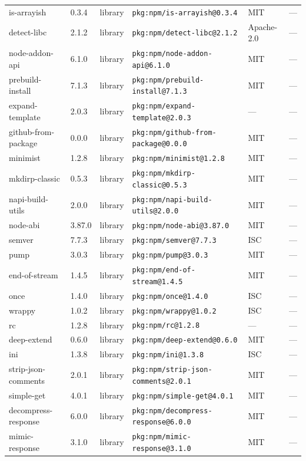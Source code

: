 \documentclass[11pt]{article}
\begin{document}
\begin{longtable}{|l|l|l|p{2.2cm}|l|p{4cm}|}
is-arrayish & 0.3.4 & library & \texttt{pkg:npm/is-arrayish@0.3.4} & MIT & — \\
detect-libc & 2.1.2 & library & \texttt{pkg:npm/detect-libc@2.1.2} & Apache-2.0 & — \\
node-addon-api & 6.1.0 & library & \texttt{pkg:npm/node-addon-api@6.1.0} & MIT & — \\
prebuild-install & 7.1.3 & library & \texttt{pkg:npm/prebuild-install@7.1.3} & MIT & — \\
expand-template & 2.0.3 & library & \texttt{pkg:npm/expand-template@2.0.3} & — & — \\
github-from-package & 0.0.0 & library & \texttt{pkg:npm/github-from-package@0.0.0} & MIT & — \\
minimist & 1.2.8 & library & \texttt{pkg:npm/minimist@1.2.8} & MIT & — \\
mkdirp-classic & 0.5.3 & library & \texttt{pkg:npm/mkdirp-classic@0.5.3} & MIT & — \\
napi-build-utils & 2.0.0 & library & \texttt{pkg:npm/napi-build-utils@2.0.0} & MIT & — \\
node-abi & 3.87.0 & library & \texttt{pkg:npm/node-abi@3.87.0} & MIT & — \\
semver & 7.7.3 & library & \texttt{pkg:npm/semver@7.7.3} & ISC & — \\
pump & 3.0.3 & library & \texttt{pkg:npm/pump@3.0.3} & MIT & — \\
end-of-stream & 1.4.5 & library & \texttt{pkg:npm/end-of-stream@1.4.5} & MIT & — \\
once & 1.4.0 & library & \texttt{pkg:npm/once@1.4.0} & ISC & — \\
wrappy & 1.0.2 & library & \texttt{pkg:npm/wrappy@1.0.2} & ISC & — \\
rc & 1.2.8 & library & \texttt{pkg:npm/rc@1.2.8} & — & — \\
deep-extend & 0.6.0 & library & \texttt{pkg:npm/deep-extend@0.6.0} & MIT & — \\
ini & 1.3.8 & library & \texttt{pkg:npm/ini@1.3.8} & ISC & — \\
strip-json-comments & 2.0.1 & library & \texttt{pkg:npm/strip-json-comments@2.0.1} & MIT & — \\
simple-get & 4.0.1 & library & \texttt{pkg:npm/simple-get@4.0.1} & MIT & — \\
decompress-response & 6.0.0 & library & \texttt{pkg:npm/decompress-response@6.0.0} & MIT & — \\
mimic-response & 3.1.0 & library & \texttt{pkg:npm/mimic-response@3.1.0} & MIT & — \\

\end{longtable}
\end{document}
